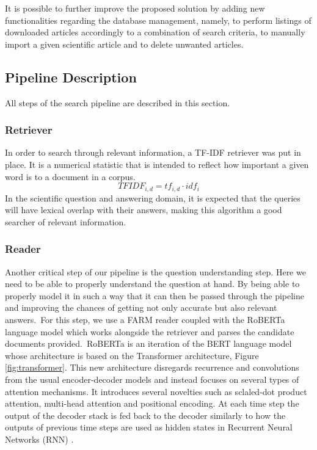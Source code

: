 \documentclass[runningheads]{llncs}
\begin{document}
It is possible to further improve the proposed solution by adding new functionalities regarding the database management, namely, to perform listings of downloaded articles accordingly to a combination of search criteria, to manually import a given scientific article and to delete unwanted articles.

\subsection{Pipeline Description}

All steps of the search pipeline are described in this section.

\subsubsection{Retriever}\label{retriever}
In order to search through relevant information, a TF-IDF retriever was put in place. It is a numerical statistic that is intended to reflect how important a given word is to a document in a corpus. 
\begin{equation}
    TFIDF_{i,d} = tf_{i,d} \cdot idf_{i}
\end{equation}
In the scientific question and answering domain, it is expected that the queries will have lexical overlap with their answers, making this algorithm a good searcher of relevant information.

\subsubsection{Reader}
Another critical step of our pipeline is the question understanding step. Here we need to be able to properly understand the question at hand. By being able to properly model it in such a way that it can then be passed through the pipeline and improving the chances of getting not only accurate but also relevant answers.\
For this step, we use a FARM reader coupled with the RoBERTa \cite{liu2019roberta} language model which works alongside the retriever and parses the candidate documents provided.\
RoBERTa is an iteration of the BERT \cite{devlin2019bert} language model whose architecture is based on the Transformer architecture, Figure \ref{fig:transformer}. This new architecture disregards recurrence and convolutions from the usual encoder-decoder models and instead focuses on several types of attention mechanisms. It introduces several novelties such as sclaled-dot product attention, multi-head attention and positional encoding. At each time step the output of the decoder stack is fed back to the decoder similarly to how the outputs of previous time steps are used as hidden states in Recurrent Neural Networks (RNN) \cite{vaswani2017attention}.
\end{document}
